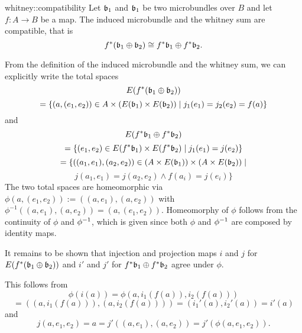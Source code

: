 \begin{mylemma}{whitney::compatibility}
    Let $\mathfrak{b}_1$ and $\mathfrak{b}_1$ be two microbundles over $B$ and let $f: A \to B$ be a map.
    The induced microbundle and the whitney sum are compatible, that is
    \[ f^*(\mathfrak{b}_1 \oplus \mathfrak{b}_2) \cong f^*\mathfrak{b}_1 \oplus f^*\mathfrak{b}_2. \]
\end{mylemma}
\begin{myproof}
    From the definition of the induced microbundle and the whitney sum, we can explicitly write the total spaces
    \[ E(f^*(\mathfrak{b}_1 \oplus \mathfrak{b}_2)) \]
    \[ = \{(a, (e_1, e_2)) \in A \times (E(\mathfrak{b}_1) \times E(\mathfrak{b}_2)) \mid j_1(e_1) = j_2(e_2) = f(a) \} \]
    and
    \[ E(f^*\mathfrak{b}_1 \oplus f^*\mathfrak{b}_2) \]
    \[ = \{(e_1, e_2) \in E(f^*\mathfrak{b}_1) \times E(f^*\mathfrak{b}_2) \mid j_1(e_1) = j(e_2)\}\]
    \[ = \{((a_1, e_1), (a_2, e_2)) \in (A \times E(\mathfrak{b}_1)) \times (A \times E(\mathfrak{b}_2)) \mid \]
    \[ j(a_1, e_1) = j(a_2, e_2) \land f(a_i) = j(e_i)\} \]
    The two total spaces are homeomorphic via $\phi(a, (e_1, e_2)) := ((a, e_1), (a, e_2))$ with $\phi^{-1}((a, e_1), (a, e_2)) = (a, (e_1, e_2))$.
    Homeomorphy of $\phi$ follows from the continuity of $\phi$ and $\phi^{-1}$, which is given since both $\phi$ and $\phi^{-1}$ are composed by identity maps.
    
    It remains to be shown that injection and projection maps $i$ and $j$ for $E(f^*(\mathfrak{b}_1 \oplus \mathfrak{b}_2))$
    and $i'$ and $j'$ for $f^*\mathfrak{b}_1 \oplus f^*\mathfrak{b}_2$ agree under $\phi$.

    This follows from
    \[ \phi(i(a)) = \phi(a, i_1(f(a)), i_2(f(a))) \]
    \[ = ((a, i_1(f(a))), (a, i_2(f(a)))) = (i_1'(a), i_2'(a)) = i'(a) \]
    and
    \[ j(a, e_1, e_2) = a = j'((a, e_1), (a, e_2)) = j'(\phi(a, e_1, e_2)). \]
\end{myproof}